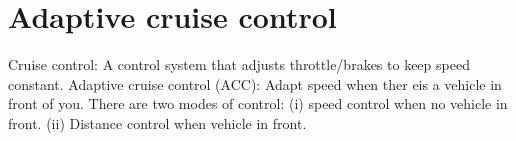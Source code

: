 \documentclass{article}
\begin{document}
\maketitle

\section{Adaptive cruise control}

Cruise control: A control system that adjusts throttle/brakes to keep speed constant. Adaptive cruise control (ACC): Adapt speed when ther eis a vehicle in front of you. 
There are two modes of control: (i) speed control when no vehicle in front. (ii) Distance control when vehicle in front. 
\end{document}
